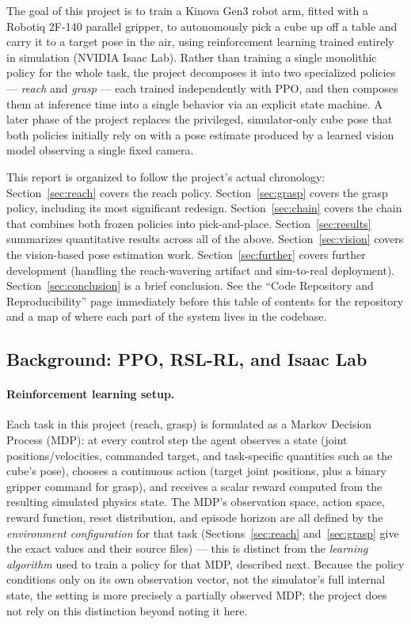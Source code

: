 \documentclass[11pt]{article}
\begin{document}
The goal of this project is to train a Kinova Gen3 robot arm, fitted with a Robotiq
2F-140 parallel gripper, to autonomously pick a cube up off a table and carry it to
a target pose in the air, using reinforcement learning trained entirely in
simulation (NVIDIA Isaac Lab). Rather than training a single monolithic policy for
the whole task, the
project decomposes it into two specialized policies --- \emph{reach} and
\emph{grasp} --- each trained independently with PPO, and then composes them at
inference time into a single behavior via an explicit state machine. A later phase
of the project replaces the privileged, simulator-only cube pose that both policies
initially rely on with a pose estimate produced by a learned vision model observing
a single fixed camera.

This report is organized to follow the project's actual chronology: Section~\ref{sec:reach}
covers the reach policy. Section~\ref{sec:grasp} covers the grasp policy, including its most
significant redesign. Section~\ref{sec:chain} covers the chain that combines both frozen
policies into pick-and-place. Section~\ref{sec:results} summarizes quantitative results across all
of the above. Section~\ref{sec:vision} covers the vision-based pose estimation work. Section~\ref{sec:further}
covers further development (handling the reach-wavering artifact and
sim-to-real deployment). Section~\ref{sec:conclusion} is a brief conclusion. See the
``Code Repository and Reproducibility'' page immediately before this table of
contents for the repository and a map of where each part of the system lives in
the codebase.

\subsection{Background: PPO, RSL-RL, and Isaac Lab}
\label{sec:background}

\paragraph{Reinforcement learning setup.} Each task in this project (reach, grasp)
is formulated as a Markov Decision Process (MDP): at every control step the agent
observes a state (joint positions/velocities, commanded target, and task-specific
quantities such as the cube's pose), chooses a continuous action (target joint
positions, plus a binary gripper command for grasp), and receives a scalar reward
computed from the resulting simulated physics state. The MDP's observation space,
action space, reward function, reset distribution, and episode horizon are all
defined by the \emph{environment configuration} for that task (Sections~\ref{sec:reach}
and~\ref{sec:grasp} give the exact values and their source files) --- this is
distinct from the \emph{learning algorithm} used to train a policy for that MDP,
described next. Because the policy conditions only on its own observation vector,
not the simulator's full internal state, the setting is more precisely a partially
observed MDP; the project does not rely on this distinction beyond noting it here.
\end{document}
